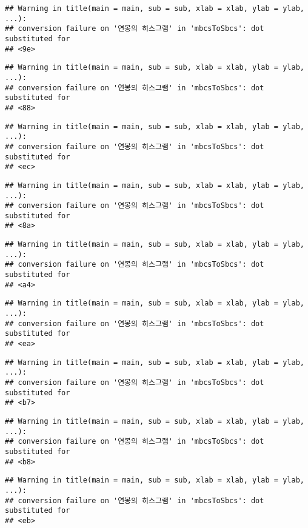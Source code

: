 \documentclass[
]{article}
\begin{document}
\begin{verbatim}
## Warning in title(main = main, sub = sub, xlab = xlab, ylab = ylab, ...):
## conversion failure on '연봉의 히스그램' in 'mbcsToSbcs': dot substituted for
## <9e>
\end{verbatim}

\begin{verbatim}
## Warning in title(main = main, sub = sub, xlab = xlab, ylab = ylab, ...):
## conversion failure on '연봉의 히스그램' in 'mbcsToSbcs': dot substituted for
## <88>
\end{verbatim}

\begin{verbatim}
## Warning in title(main = main, sub = sub, xlab = xlab, ylab = ylab, ...):
## conversion failure on '연봉의 히스그램' in 'mbcsToSbcs': dot substituted for
## <ec>
\end{verbatim}

\begin{verbatim}
## Warning in title(main = main, sub = sub, xlab = xlab, ylab = ylab, ...):
## conversion failure on '연봉의 히스그램' in 'mbcsToSbcs': dot substituted for
## <8a>
\end{verbatim}

\begin{verbatim}
## Warning in title(main = main, sub = sub, xlab = xlab, ylab = ylab, ...):
## conversion failure on '연봉의 히스그램' in 'mbcsToSbcs': dot substituted for
## <a4>
\end{verbatim}

\begin{verbatim}
## Warning in title(main = main, sub = sub, xlab = xlab, ylab = ylab, ...):
## conversion failure on '연봉의 히스그램' in 'mbcsToSbcs': dot substituted for
## <ea>
\end{verbatim}

\begin{verbatim}
## Warning in title(main = main, sub = sub, xlab = xlab, ylab = ylab, ...):
## conversion failure on '연봉의 히스그램' in 'mbcsToSbcs': dot substituted for
## <b7>
\end{verbatim}

\begin{verbatim}
## Warning in title(main = main, sub = sub, xlab = xlab, ylab = ylab, ...):
## conversion failure on '연봉의 히스그램' in 'mbcsToSbcs': dot substituted for
## <b8>
\end{verbatim}

\begin{verbatim}
## Warning in title(main = main, sub = sub, xlab = xlab, ylab = ylab, ...):
## conversion failure on '연봉의 히스그램' in 'mbcsToSbcs': dot substituted for
## <eb>
\end{verbatim}
\end{document}
